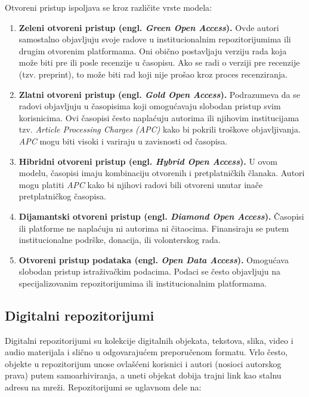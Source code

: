 \documentclass{article}
\begin{document}
Otvoreni pristup ispoljava se kroz različite vrste modela\cite{eve2014open}:

\begin{enumerate}
    \item \textbf{Zeleni otvoreni pristup (engl. \textit{Green Open Access}).} Ovde autori samostalno objavljuju svoje radove u institucionalnim repozitorijumima ili drugim otvorenim platformama. Oni obično postavljaju verziju rada koja može biti pre ili posle recenzije u časopisu. Ako se radi o verziji pre recenzije (tzv. preprint), to može biti rad koji nije prošao kroz proces recenziranja.
    \item \textbf{Zlatni otvoreni pristup (engl. \textit{Gold Open Access}).} Podrazumeva da se radovi objavljuju u časopisima koji omogućavaju slobodan pristup svim korisnicima. Ovi časopisi često naplaćuju autorima ili njihovim institucijama tzv. \textit{Article Processing Charges (APC)} kako bi pokrili troškove objavljivanja. \textit{APC} mogu biti visoki i variraju u zavisnosti od časopisa.
    \item \textbf{Hibridni otvoreni pristup (engl. \textit{Hybrid Open Access}).} U ovom modelu, časopisi imaju kombinaciju otvorenih i pretplatničkih članaka. Autori mogu platiti \textit{APC} kako bi njihovi radovi bili otvoreni unutar inače pretplatničkog časopisa.
    \item \textbf{Dijamantski otvoreni pristup (engl. \textit{Diamond Open Access}).} Časopisi ili platforme ne naplaćuju ni autorima ni čitaocima. Finansiraju se putem institucionalne podrške, donacija, ili volonterskog rada.
    \item \textbf{Otvoreni pristup podataka (engl. \textit{Open Data Access}).} Omogućava slobodan pristup istraživačkim podacima. Podaci se često objavljuju na specijalizovanim repozitorijumima ili institucionalnim platformama.
\end{enumerate}


\subsection{Digitalni repozitorijumi}

Digitalni repozitorijumi su kolekcije digitalnih objekata, tekstova, slika, video i audio materijala i slično u odgovarajućem preporučenom formatu. Vrlo često, objekte u repozitorijum unose ovlašćeni korisnici i autori (nosioci autorskog prava) putem samoarhiviranja, a uneti objekat dobija trajni link kao stalnu adresu na mreži. Repozitorijumi se uglavnom dele na:
\end{document}
